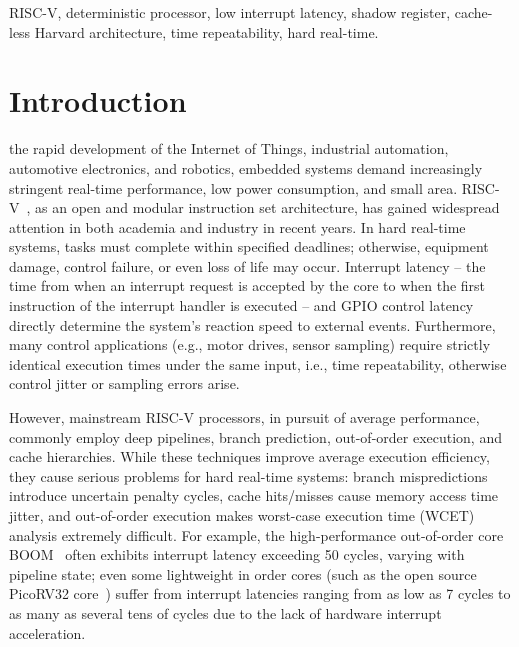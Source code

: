 \documentclass[letterpaper,journal]{IEEEtran}
\begin{document}
\begin{IEEEkeywords}
RISC-V, deterministic processor, low interrupt latency, shadow register, cache-less Harvard architecture, time repeatability, hard real-time.
\end{IEEEkeywords}

\section{Introduction}
 the rapid development of the Internet of Things, industrial automation, automotive electronics, and robotics, embedded systems demand increasingly stringent real-time performance, low power consumption, and small area. RISC-V~\cite{ref7}, as an open and modular instruction set architecture, has gained widespread attention in both academia and industry in recent years. In hard real-time systems, tasks must complete within specified deadlines; otherwise, equipment damage, control failure, or even loss of life may occur. Interrupt latency -- the time from when an interrupt request is accepted by the core to when the first instruction of the interrupt handler is executed -- and GPIO control latency directly determine the system's reaction speed to external events. Furthermore, many control applications (e.g., motor drives, sensor sampling) require strictly identical execution times under the same input, i.e., time repeatability, otherwise control jitter or sampling errors arise.

However, mainstream RISC-V processors, in pursuit of average performance, commonly employ deep pipelines, branch prediction, out-of-order execution, and cache hierarchies.
While these techniques improve average execution efficiency, they cause serious problems for hard real-time systems: branch mispredictions introduce uncertain penalty cycles, cache hits/misses cause memory access time jitter, and out-of-order execution makes worst-case execution time (WCET) analysis extremely difficult.
For example, the high-performance out-of-order core BOOM~\cite{ref24} often exhibits interrupt latency exceeding 50 cycles, varying with pipeline state; even some lightweight in order cores (such as the open source PicoRV32 core~\cite{ref29}) suffer from interrupt latencies ranging from as low as 7 cycles to as many as several tens of cycles due to the lack of hardware interrupt acceleration.
\end{document}
